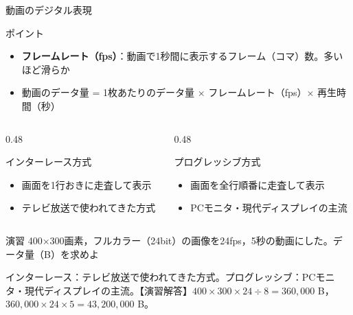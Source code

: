 \documentclass[aspectratio=43,professionalfonts,handout,10pt]{beamer}
\begin{document}

\begin{frame}[shrink=8]{動画のデジタル表現}
  \begin{block}{ポイント}
    \begin{itemize}
      \item \textbf{フレームレート（fps）}：動画で1秒間に表示するフレーム（コマ）数。多いほど滑らか
      \item 動画のデータ量 = 1枚あたりのデータ量 × フレームレート（fps）× 再生時間（秒）
    \end{itemize}
  \end{block}

  \vfill

  \begin{columns}[T]
    \begin{column}{0.48\textwidth}
      \begin{exampleblock}{インターレース方式}
        \small
        \begin{itemize}
          \item 画面を1行おきに走査して表示
          \item テレビ放送で使われてきた方式
        \end{itemize}
      \end{exampleblock}
    \end{column}
    \begin{column}{0.48\textwidth}
      \begin{block}{プログレッシブ方式}
        \small
        \begin{itemize}
          \item 画面を全行順番に走査して表示
          \item PCモニタ・現代ディスプレイの主流
        \end{itemize}
      \end{block}
    \end{column}
  \end{columns}

  \begin{alertblock}{演習}
    400×300画素，フルカラー（24bit）の画像を24fps，5秒の動画にした。データ量（B）を求めよ
  \end{alertblock}

  \begin{slidenote}
    \scriptsize インターレース：テレビ放送で使われてきた方式。プログレッシブ：PCモニタ・現代ディスプレイの主流。【演習解答】$400\times300\times24\div8=360{,}000$ B，$360{,}000\times24\times5=43{,}200{,}000$ B。
  \end{slidenote}
\end{frame}
\end{document}
